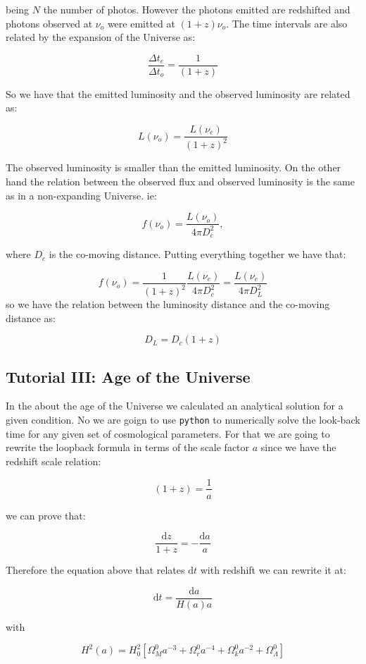 \documentclass[
  letterpaper,
  DIV=11,
  numbers=noendperiod]{scrreprt}
\begin{document}
being \(N\) the number of photos. However the photons emitted are
redshifted and photons observed at \(\nu_o\) were emitted at
\((1+z)\nu_o\). The time intervals are also related by the expansion of
the Universe as:

\[\frac{\Delta t_e}{\Delta t_o} = \frac{1}{(1+z)}\]

So we have that the emitted luminosity and the observed luminosity are
related as:

\[L(\nu_o) = \frac{L(\nu_e)}{(1+z)^2}\]

The observed luminosity is smaller than the emitted luminosity. On the
other hand the relation between the observed flux and observed
luminosity is the same as in a non-expanding Universe. ie:

\[f(\nu_o) = \frac{L(\nu_o)}{4\pi D_c^2},\]

where \(D_c\) is the co-moving distance. Putting everything together we
have that:

\[f(\nu_o) = \frac{1}{(1+z)^2}\frac{L(\nu_e)}{4\pi D_c^2} = \frac{L(\nu_e)}{4\pi D_L^2}\]
so we have the relation between the luminosity distance and the
co-moving distance as:

\[D_L = D_c(1+z)\]

\subsection*{Tutorial III: Age of the
Universe}\label{tutorial-iii-age-of-the-universe}

In the about the age of the Universe we calculated an analytical
solution for a given condition. No we are goign to use \texttt{python}
to numerically solve the look-back time for any given set of
cosmological parameters. For that we are going to rewrite the loopback
formula in terms of the scale factor \(a\) since we have the redshift
scale relation:

\[(1+z) = \frac{1}{a}\]

we can prove that:

\[\frac{\mathrm{ d}z}{1 +z} = -\frac{\mathrm{ d}a}{a}\]

Therefore the equation above that relates \(\mathrm{d}t\) with redshift
we can rewrite it at:

\[ \mathrm{ d}t = \frac{\mathrm{d}a}{H(a)a} \]

with

\[  H^2(a) = H^2_0 [\Omega^0_M a^{-3} + \Omega^0_r a^{-4} + \Omega^0_k a^{-2} +\Omega^0_\Lambda] \]
\end{document}
